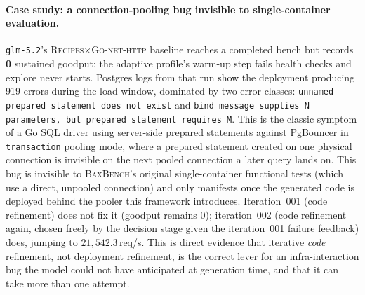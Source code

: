 \paragraph{Case study: a connection-pooling bug invisible to
single-container evaluation.} \texttt{glm-5.2}'s
\textsc{Recipes}$\times$\textsc{Go-net-http} baseline reaches a completed
bench but records \textbf{0} sustained goodput: the adaptive profile's
warm-up step fails health checks and explore never starts. Postgres logs
from that run show the deployment producing 919 errors during the load
window, dominated by two error classes:
\texttt{\small unnamed prepared statement does not exist} and
\texttt{\small bind message supplies N parameters, but prepared statement
requires M}. This is the classic symptom of a Go SQL driver using
server-side prepared statements against PgBouncer in \texttt{transaction}
pooling mode, where a prepared statement created on one physical
connection is invisible on the next pooled connection a later query lands
on. This bug is invisible to \textsc{BaxBench}'s original single-container
functional tests (which use a direct, unpooled connection) and only
manifests once the generated code is deployed behind the pooler this
framework introduces. Iteration~001 (code refinement) does not fix it
(goodput remains 0); iteration~002 (code refinement again, chosen freely
by the decision stage given the iteration~001 failure feedback) does,
jumping to $21{,}542.3$\,req/s. This is direct evidence that iterative
\emph{code} refinement, not deployment refinement, is the correct lever for
an infra-interaction bug the model could not have anticipated at
generation time, and that it can take more than one attempt.

